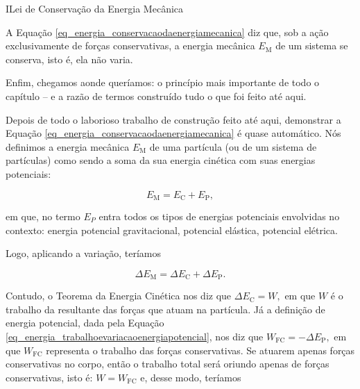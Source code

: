 












\begin{secnivel}{I}{Lei de Conservação da Energia Mecânica}


  
\end{secnivel}

A Equação \eqref{eq_energia_conservacaodaenergiamecanica} diz que, sob a ação exclusivamente de forças conservativas, a energia mecânica $E_\text{M}$ de um sistema se conserva, isto é, ela não varia.






Enfim, chegamos aonde queríamos: o princípio mais importante de todo o capítulo -- e a razão de termos construído tudo o que foi feito até aqui.

Depois de todo o laborioso trabalho de construção feito até aqui, demonstrar a Equação \eqref{eq_energia_conservacaodaenergiamecanica} é quase automático. Nós definimos a energia mecânica $E_\text{M}$ de uma partícula (ou de um sistema de partículas) como sendo a soma da sua energia cinética com suas energias potenciais:

$$ E_\text{M} = E_\text{C}  + E_\text{P},$$

\noindent em que, no termo $E_P$ entra todos os tipos de energias potenciais envolvidas no contexto: energia potencial gravitacional, potencial elástica, potencial elétrica.

Logo, aplicando a variação, teríamos

$$ \Delta E_\text{M} = \Delta E_\text{C}  + \Delta E_\text{P}.$$

Contudo, o Teorema da Energia Cinética nos diz que $\Delta E_\text{C}=W,$ em que $W$ é o trabalho da resultante das forças que atuam na partícula. Já a definição de energia potencial, dada pela Equação \eqref{eq_energia_trabalhoevariacaoenergiapotencial}, nos diz que $W_\text{FC} = - \Delta E_\text{P},$ em que $W_\text{FC}$ representa o trabalho das forças conservativas. Se atuarem apenas forças conservativas no corpo, então o trabalho total será oriundo apenas de forças conservativas, isto é: $W = W_\text{FC} $ e, desse modo, teríamos  

